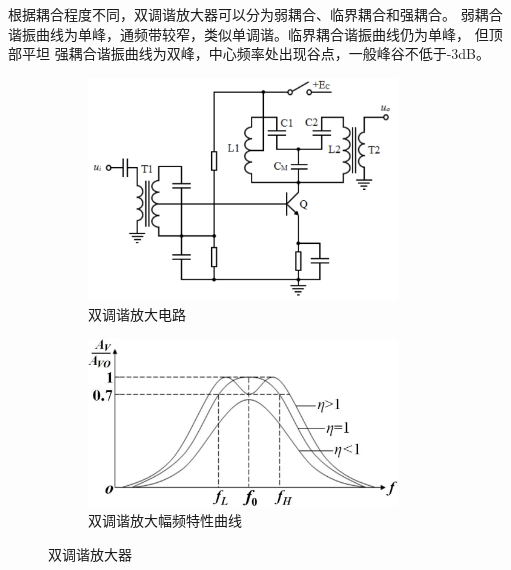 \documentclass[UTF8]{ctexart}
\begin{document}
根据耦合程度不同，双调谐放大器可以分为弱耦合、临界耦合和强耦合。
弱耦合谐振曲线为单峰，通频带较窄，类似单调谐。临界耦合谐振曲线仍为单峰， 但顶部平坦
强耦合谐振曲线为双峰，中心频率处出现谷点，一般峰谷不低于-3dB。

\begin{figure}[H]
    \centering
    \begin{subfigure}[c]{0.45\textwidth}
        \centering
        \includegraphics[width=0.9\textwidth]{pics/bi_harmo_amplifier.png}
        \caption{双调谐放大电路}\label{subfig:bi_harmo_amplifier}
    \end{subfigure}
    \begin{subfigure}[c]{0.45\textwidth}
        \centering
        \includegraphics[width=0.9\textwidth]{pics/bi_amp_f_characteristics.png}
        \caption{双调谐放大幅频特性曲线}\label{subfig:bi_amp_f_characteristics}
    \end{subfigure}
    \caption{双调谐放大器}\label{fig:bi_harmo_amplifier}
\end{figure}
\end{document}
